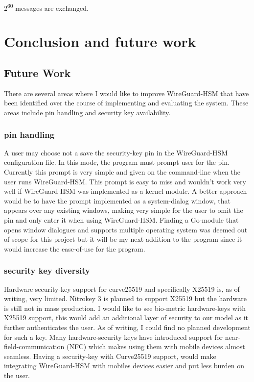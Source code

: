 \documentclass [11pt, proquest] {uwthesis}[2020/02/24]
\begin{document}
2\textsuperscript{60} messages are exchanged.


\chapter {Conclusion and future work}

\section {Future Work}
There are several areas where I would like to improve WireGuard-HSM that have been identified over the course of implementing and evaluating the system. These areas include pin handling and security key availability. 

\subsection{pin handling}
 A user may choose not a save the security-key pin in the WireGuard-HSM configuration file. In this mode, the program must prompt user for the pin. Currently this prompt is very simple and given on the command-line when the user runs WireGuard-HSM. This prompt is easy to miss and wouldn't work very well if WireGuard-HSM was implemented as a kernel module. A better approach would be to have the prompt implemented as a system-dialog window, that appears over any existing windows, making very simple for the user to omit the pin and only enter it when using WireGuard-HSM. Finding a Go-module that opens window dialogues and supports multiple operating system was deemed out of scope for this project but it will be my next addition to the program since it would increase the ease-of-use for the program. 
 
\subsection{security key diversity}
Hardware security-key support for curve25519 and specifically X25519 is, as of writing, very limited. Nitrokey 3 is planned to support X25519 but the hardware is still not in mass production. I would like to see bio-metric hardware-keys with X25519 support, this would add an additional layer of security to our model as it further authenticates the user. As of writing, I could find no planned development for such a key. Many hardware-security keys have introduced support for near-field-communication (NFC) which makes using them with mobile devices almost seamless. Having a security-key with Curve25519 support, would make integrating WireGuard-HSM with mobiles devices easier and put less burden on the user. 
\end{document}
